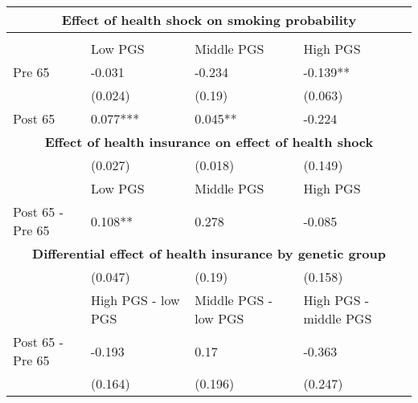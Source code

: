 % 
\begin{tabular}{llll}
  \toprule
  \multicolumn{4}{c}{ \textbf{Effect of health shock on smoking probability}} \\
 \midrule
 &  &  &  \\ 
   \midrule
 & Low PGS & Middle PGS & High PGS \\ 
  Pre 65 & -0.031 & -0.234 & -0.139** \\ 
   & (0.024) & (0.19) & (0.063) \\ 
  Post 65 & 0.077*** & 0.045** & -0.224 \\ 
   \toprule \multicolumn{4}{c}{ \textbf{Effect of health insurance on effect of health shock}} \\
 \midrule
 & (0.027) & (0.018) & (0.149) \\ 
   \midrule
 & Low PGS & Middle PGS & High PGS \\ 
  Post 65 - Pre 65 & 0.108** & 0.278 & -0.085 \\ 
   \toprule \multicolumn{4}{c}{ \textbf{Differential effect of health insurance by genetic group}} \\
 \midrule
 & (0.047) & (0.19) & (0.158) \\ 
   \midrule
 & High PGS - low PGS & Middle PGS - low PGS & High PGS - middle PGS \\ 
  Post 65 - Pre 65 & -0.193 & 0.17 & -0.363 \\ 
   & (0.164) & (0.196) & (0.247) \\ 
  \end{tabular}
